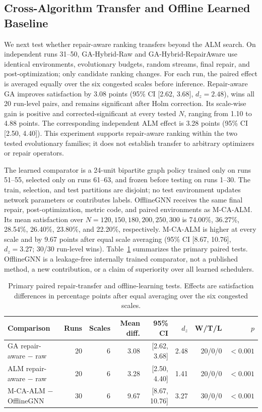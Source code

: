 \documentclass[pdflatex,sn-mathphys-num]{sn-jnl}
\begin{document}
\subsection{Cross-Algorithm Transfer and Offline Learned Baseline}
We next test whether repair-aware ranking transfers beyond the ALM search. On independent runs 31--50, GA-Hybrid-Raw and GA-Hybrid-RepairAware use identical environments, evolutionary budgets, random streams, final repair, and post-optimization; only candidate ranking changes. For each run, the paired effect is averaged equally over the six congested scales before inference. Repair-aware GA improves satisfaction by 3.08 points (95\% CI [2.62, 3.68], $d_z=2.48$), wins all 20 run-level pairs, and remains significant after Holm correction. Its scale-wise gain is positive and corrected-significant at every tested $N$, ranging from 1.10 to 4.88 points. The corresponding independent ALM effect is 3.28 points (95\% CI [2.50, 4.40]). This experiment supports repair-aware ranking within the two tested evolutionary families; it does not establish transfer to arbitrary optimizers or repair operators.

The learned comparator is a 24-unit bipartite graph policy trained only on runs 51--55, selected only on runs 61--63, and frozen before testing on runs 1--30. The train, selection, and test partitions are disjoint; no test environment updates network parameters or contributes labels. OfflineGNN receives the same final repair, post-optimization, metric code, and paired environments as M-CA-ALM. Its mean satisfaction over $N=120,150,180,200,250,300$ is 74.00\%, 36.27\%, 28.54\%, 26.40\%, 23.80\%, and 22.20\%, respectively. M-CA-ALM is higher at every scale and by 9.67 points after equal scale averaging (95\% CI [8.67, 10.76], $d_z=3.27$; 30/30 run-level wins). Table~\ref{tab:transfer_learning} summarizes the primary paired tests. OfflineGNN is a leakage-free internally trained comparator, not a published method, a new contribution, or a claim of superiority over all learned schedulers.

\begin{table}[t]
\centering
\caption{Primary paired repair-transfer and offline-learning tests. Effects are satisfaction differences in percentage points after equal averaging over the six congested scales.}
\label{tab:transfer_learning}
\scriptsize
\setlength{\tabcolsep}{2.5pt}
\begin{tabular}{lrrrrrrr}
\toprule
Comparison & Runs & Scales & Mean diff. & 95\% CI & $d_z$ & W/T/L & $p$ \\
\midrule
GA repair-aware $-$ raw & 20 & 6 & 3.08 & [2.62, 3.68] & 2.48 & 20/0/0 & $<0.001$ \\
ALM repair-aware $-$ raw & 20 & 6 & 3.28 & [2.50, 4.40] & 1.41 & 20/0/0 & $<0.001$ \\
M-CA-ALM $-$ OfflineGNN & 30 & 6 & 9.67 & [8.67, 10.76] & 3.27 & 30/0/0 & $<0.001$ \\
\bottomrule
\end{tabular}
\end{table}
\end{document}
